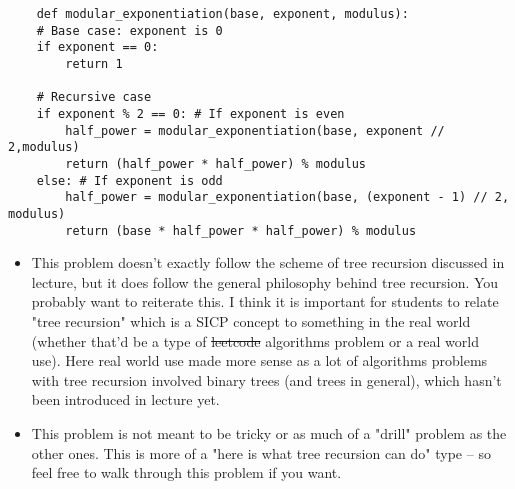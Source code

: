     \begin{blocksection}
    \begin{solution}
    \begin{lstlisting}
    def modular_exponentiation(base, exponent, modulus):
    # Base case: exponent is 0
    if exponent == 0:
        return 1
    
    # Recursive case
    if exponent % 2 == 0: # If exponent is even
        half_power = modular_exponentiation(base, exponent // 2,modulus)
        return (half_power * half_power) % modulus
    else: # If exponent is odd
        half_power = modular_exponentiation(base, (exponent - 1) // 2, modulus)
        return (base * half_power * half_power) % modulus
    \end{lstlisting}
    \end{solution}
    \end{blocksection}
    
    \begin{blocksection}
    \begin{guide}
    \begin{itemize}
      \item This problem doesn't exactly follow the scheme of tree recursion discussed in lecture, but it does follow the general philosophy behind tree recursion. You probably want to reiterate this.
      \subitem I think it is important for students to relate "tree recursion" which is a SICP concept to something in the real world (whether that'd be a type of \st{leetcode} algorithms problem or a real world use). Here real world use made more sense as a lot of algorithms problems with tree recursion involved binary trees (and trees in general), which hasn't been introduced in lecture yet. 
      \item This problem is not meant to be tricky or as much of a "drill" problem as the other ones. This is more of a "here is what tree recursion can do" type -- so feel free to walk through this problem if you want.
    \end{itemize}
    \end{guide}
    \end{blocksection}
    